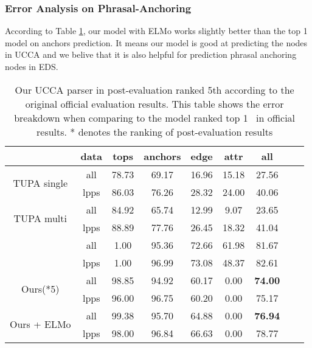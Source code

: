 \subsubsection{Error Analysis on Phrasal-Anchoring}

According to Table \ref{tbl:results_ucca}, our model with ELMo works
slightly better than the top 1 model on anchors prediction. It means
our model is good at predicting the nodes in UCCA and we belive that
it is also helpful for prediction phrasal anchoring nodes in EDS.

\begin{table}[!h]
\small
\centering
\setlength{\tabcolsep}{2.5pt}

\begin{tabular}{ccccccccc}
\toprule
                              & data & tops  & anchors & edge  & attr  & all   \\ \hline
\multirow{2}{*}{ TUPA
single }                      & all  & 78.73 & 69.17   & 16.96 & 15.18 & 27.56 \\
                              & lpps & 86.03 & 76.26   & 28.32 & 24.00 & 40.06 \\
\multirow{2}{*}{ TUPA
multi }                       & all  & 84.92 & 65.74   & 12.99 &  9.07 & 23.65 \\
                              & lpps & 88.89 & 77.76   & 26.45 & 18.32 & 41.04 \\
\multirow{2}{*}{\cite{Che:Dou:Xu:19}}       & all  & 1.00  & 95.36   & 72.66 & 61.98 & 81.67 \\
                              & lpps & 1.00  & 96.99   & 73.08 & 48.37 & 82.61 \\ \hline
\multirow{2}{*}{ Ours(*5)}    & all  & 98.85 & 94.92   & 60.17 & 0.00  & {\bf 74.00} \\
                              & lpps & 96.00 & 96.75   & 60.20 & 0.00  & 75.17 \\
\multirow{2}{*}{ Ours + ELMo} & all  & 99.38 & 95.70   & 64.88 & 0.00  & {\bf 76.94} \\
                              & lpps & 98.00 & 96.84   & 66.63 & 0.00  & 78.77 \\ \bottomrule
\end{tabular}
\caption{\label{tbl:results_ucca} Our UCCA parser in post-evaluation ranked 5th according to the original official evaluation results. This table shows the error breakdown when comparing to the model ranked top 1~\cite{Che:Dou:Xu:19} in official results. * denotes the ranking of post-evaluation results }
\end{table}

